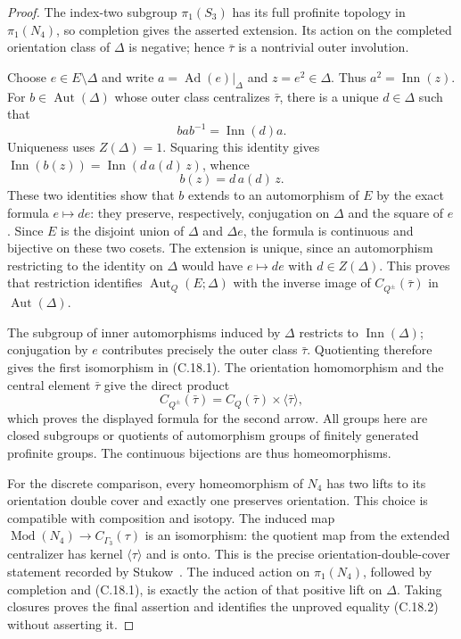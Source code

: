\documentclass[11pt,oneside]{article}
\begin{document}
\begin{proof}
The index-two subgroup $\pi_1(S_3)$ has its full profinite
topology in $\pi_1(N_4)$, so completion gives the asserted
extension. Its action on the completed orientation class
of $\Delta$ is negative; hence $\bar\tau$ is a nontrivial
outer involution.

Choose $e\in E\setminus\Delta$ and write
$a=\operatorname{Ad}(e)|_\Delta$ and $z=e^2\in\Delta$.
Thus $a^2=\operatorname{Inn}(z)$.
For $b\in\operatorname{Aut}(\Delta)$ whose outer class
centralizes $\bar\tau$, there is a unique $d\in\Delta$
such that
\[
 b a b^{-1}=\operatorname{Inn}(d)a.
\]
Uniqueness uses $Z(\Delta)=1$. Squaring this identity
gives
$\operatorname{Inn}(b(z))
 =\operatorname{Inn}(d\,a(d)\,z)$, whence
\[
 b(z)=d\,a(d)\,z.
\]
These two identities show that $b$ extends to an
automorphism of $E$ by the exact formula $e\mapsto de$:
they preserve, respectively, conjugation on $\Delta$
and the square of $e$. Since $E$ is the disjoint union
of $\Delta$ and $\Delta e$, the formula is continuous
and bijective on these two cosets. The extension is
unique, since an automorphism restricting to the identity
on $\Delta$ would have $e\mapsto de$ with
$d\in Z(\Delta)$.
This proves that restriction identifies
$\operatorname{Aut}_Q(E;\Delta)$ with the inverse image
of $C_{Q^\pm}(\bar\tau)$ in
$\operatorname{Aut}(\Delta)$.

The subgroup of inner automorphisms induced by $\Delta$
restricts to $\operatorname{Inn}(\Delta)$; conjugation
by $e$ contributes precisely the outer class $\bar\tau$.
Quotienting therefore gives the first isomorphism in
(C.18.1). The orientation homomorphism and the central
element $\bar\tau$ give the direct product
\[
 C_{Q^\pm}(\bar\tau)
       =C_Q(\bar\tau)\times\langle\bar\tau\rangle,
\]
which proves the displayed formula for the second arrow.
All groups here are closed subgroups or quotients of
automorphism groups of finitely generated profinite
groups. The continuous bijections are thus
homeomorphisms.

For the discrete comparison, every homeomorphism of
$N_4$ has two lifts to its orientation double cover and
exactly one preserves orientation. This choice is
compatible with composition and isotopy. The induced
map
$\operatorname{Mod}(N_4)\to C_{\Gamma_3}(\tau)$ is
an isomorphism: the quotient map from the extended
centralizer has kernel $\langle\tau\rangle$ and is onto.
This is the precise orientation-double-cover statement
recorded by Stukow~\cite[p.~1030]{CextraStukow2016}.
The induced action on $\pi_1(N_4)$, followed by completion
and (C.18.1), is exactly the action of that positive
lift on $\Delta$. Taking closures proves the final
assertion and identifies the unproved equality
(C.18.2) without asserting it.
\end{proof}
\end{document}
